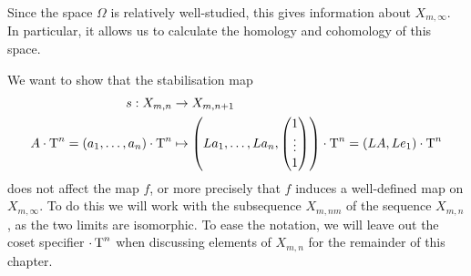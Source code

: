 Since the space $\Omega$ is relatively well-studied, this gives
information about $X_{m,\infty}$. In particular, it allows us to
calculate the homology and cohomology of this space.

We want to show that the stabilisation map
\begin{align*}
  s : X_{m,n} &\to X_{m,n+1} \\
  A\cdot \operatorname{T}^n = (a_1,\dots,a_n)\cdot \operatorname{T}^n 
              &\mapsto \left(La_1,\dots,La_n,
    \begin{pmatrix}
      1 \\
      \vdots\\
      1
    \end{pmatrix} 
\right) \cdot \operatorname{T}^n = (LA,Le_1) \cdot \operatorname{T}^n
\end{align*}
does not affect the map $f$, or more precisely that $f$ induces a
well-defined map on $X_{m,\infty}$. To do this we will work with the
subsequence $X_{m,nm}$ of the sequence $X_{m,n}$, as the two limits
are isomorphic.  To
ease the notation, we will leave out the coset specifier $\cdot \operatorname{T}^n$
when discussing elements of $X_{m,n}$ for the remainder of this
chapter.

